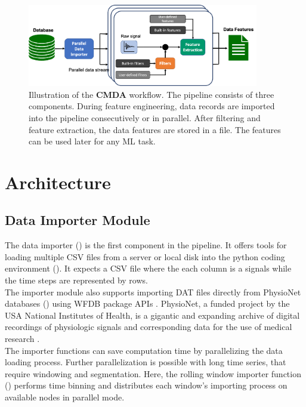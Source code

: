 \documentclass{article}
\begin{document}
\begin{figure}[h]
\includegraphics[width=0.9\textwidth]{workflow.png}
\centering
\caption{Illustration of the \textbf{CMDA} workflow. The pipeline consists of three components. During feature engineering, data records are imported into the pipeline consecutively or in parallel. After filtering and feature extraction, the data features are stored in a file. The features can be used later for any ML task.}
\label{fig:workflow}
\end{figure}



\section{Architecture}
\subsection{Data Importer Module}
The data importer () is the first component in the pipeline. It offers tools for loading multiple CSV files from a server or local disk into the python coding environment (). It expects a CSV file where the each column is a signals while the time steps are represented by rows.\\
The importer module also supports importing DAT files directly from PhysioNet databases () using WFDB package APIs \cite{xie_chen_waveform_nodate}.
PhysioNet, a funded project by the USA National Institutes of Health, is a gigantic and expanding archive of digital recordings of physiologic signals and corresponding data for the use of medical research \cite{goldberger_physiobank_2000}.\\
The importer functions can save computation time by parallelizing the data loading process. 
Further parallelization is possible with long time series, that require windowing and segmentation.
Here, the rolling window importer function () performs time binning and distributes each window's importing process on available nodes in parallel mode.
\end{document}
